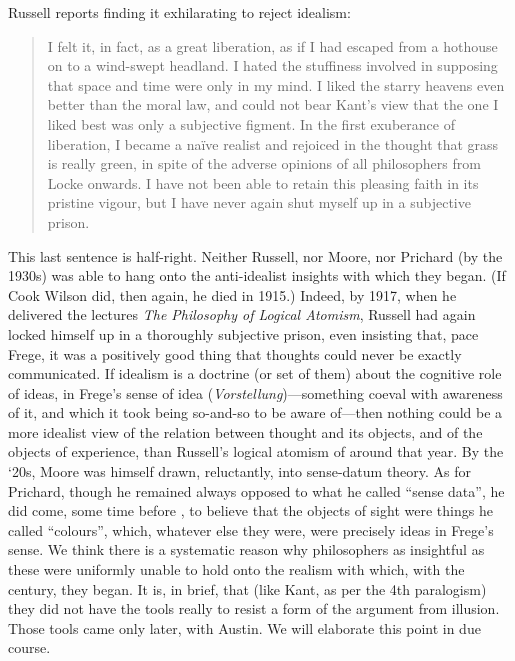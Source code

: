 Russell reports finding it exhilarating to reject idealism:
\begin{quote}
	I felt it, in fact, as a great liberation, as if I had escaped from a hothouse on to a wind-swept headland. I hated the stuffiness involved in supposing that space and time were only in my mind. I liked the starry heavens even better than the moral law, and could not bear Kant’s view that the one I liked best was only a subjective figment. In the first exuberance of liberation, I became a naïve realist and rejoiced in the thought that grass is really green, in spite of the adverse opinions of all philosophers from Locke onwards. I have not been able to retain this pleasing faith in its pristine vigour, but I have never again shut myself up in a subjective prison. \citep[48]{Russell:1959fv}
\end{quote}
This last sentence is half-right. Neither Russell, nor Moore, nor Prichard (by the 1930s) was able to hang onto the anti-idealist insights with which they began. (If Cook Wilson did, then again, he died in 1915.) Indeed, by 1917, when he delivered the lectures \emph{The Philosophy of Logical Atomism}, Russell had again locked himself up in a thoroughly subjective prison, even insisting that, pace Frege, it was a positively good thing that thoughts could never be exactly communicated. If idealism is a doctrine (or set of them) about the cognitive role of ideas, in Frege’s sense of idea (\emph{Vorstellung})---something coeval with awareness of it, and which it took being so-and-so to be aware of---then nothing could be a more idealist view of the relation between thought and its objects, and of the objects of experience, than Russell’s logical atomism of around that year. By the ‘20s, Moore was himself drawn, reluctantly, into sense-datum theory. As for Prichard, though he remained always opposed to what he called ``sense data'', he did come, some time before \citeyear{Prichard:1938ve}, to believe that the objects of sight were things he called ``colours'', which, whatever else they were, were precisely ideas in Frege’s sense. We think there is a systematic reason why philosophers as insightful as these were uniformly unable to hold onto the realism with which, with the century, they began. It is, in brief, that (like Kant, as per the 4th paralogism) they did not have the tools really to resist a form of the argument from illusion. Those tools came only later, with Austin. We will elaborate this point in due course.


